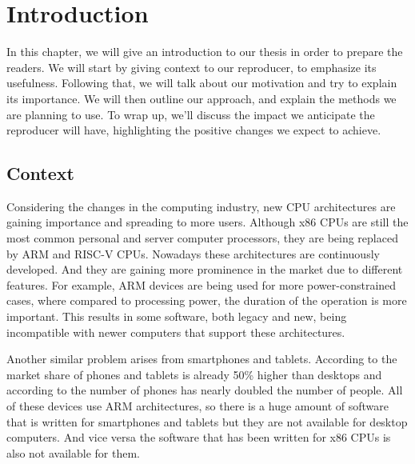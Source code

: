 
\chapter{Introduction}\label{chapter:introduction}
In this chapter, we will give an introduction to our thesis in order to prepare the readers.
We will start by giving context to our reproducer, to emphasize its usefulness.
Following that, we will talk about our motivation and try to explain its importance. 
We will then outline our approach, and explain the methods we are planning to use. 
To wrap up, we'll discuss the impact we anticipate the reproducer will have, highlighting the positive changes we expect to achieve.


\section{Context}
Considering the changes in the computing industry, new CPU architectures are gaining importance and spreading to more users.
Although x86 CPUs are still the most common personal and server computer processors, they are being replaced by ARM and RISC-V CPUs.
Nowadays these architectures are continuously developed.
And they are gaining more prominence in the market due to different features.
For example, ARM devices are being used for more power-constrained cases, where compared to processing power, the duration of the operation is more important.
This results in some software, both legacy and new, being incompatible with newer computers that support these architectures.

Another similar problem arises from smartphones and tablets.
According to \cite{statscounter} the market share of phones and tablets is already 50\% higher than desktops and according to \cite{radicati} the number of phones has nearly doubled the number of people.
All of these devices use ARM architectures, so there is a huge amount of software that is written for smartphones and tablets but they are not available for desktop computers.
And vice versa the software that has been written for x86 CPUs is also not available for them.

